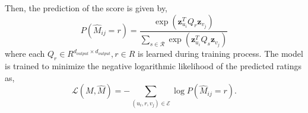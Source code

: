 Then, the prediction of the score is given by,
\begin{equation}
    P\left(\hat{M}_{i j}=r\right)=\frac{\exp \left(\mathbf{z}_{u_{i}}^{T} Q_{r} \mathbf{z}_{v_{j}}\right)}{\sum_{s \in \mathcal{R}} \exp \left(\mathbf{z}_{u_{i}}^{T} Q_{s} \mathbf{z}_{v_{j}}\right)}
\end{equation}
where each $Q_r \in R^{d_{output} \times d_{output}}, r \in R$ is learned during training process.
The model is trained to minimize the negative logarithmic likelihood of 
the predicted ratings as,
\begin{equation}
    \mathcal{L}(M, \hat{M})=-\sum_{\left(u_{i}, r, v_{j}\right) \in \mathcal{E}} \log P\left(\hat{M}_{i j}=r\right).
\end{equation}
